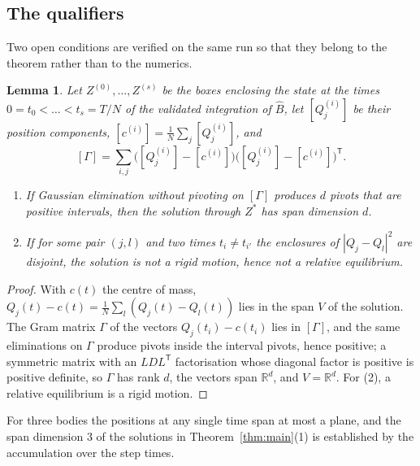 \documentclass[11pt]{amsart}
\newtheorem{lemma}[theorem]{Lemma}
\theoremstyle{definition}
\newcommand{\R}{\mathbb{R}}
\newcommand{\intv}[1]{[#1]}
\begin{document}
\subsection{The qualifiers}
Two open conditions are verified on the same run so that they belong to the theorem rather than to the numerics.

\begin{lemma}\label{lem:qualifiers}
Let $Z^{(0)},\dots,Z^{(s)}$ be the boxes enclosing the state at the times $0=t_0<\dots<t_s=T/N$ of the validated integration of $\hat B$, let $\intv{Q_j^{(i)}}$ be their position components, $\intv{c^{(i)}}=\frac1N\sum_j\intv{Q_j^{(i)}}$, and
\[
\intv{\Gamma}=\sum_{i,j}\big(\intv{Q_j^{(i)}}-\intv{c^{(i)}}\big)\big(\intv{Q_j^{(i)}}-\intv{c^{(i)}}\big)^{\mathsf T}.
\]
\begin{enumerate}
\item If Gaussian elimination without pivoting on $\intv{\Gamma}$ produces $d$ pivots that are positive intervals, then the solution through $Z^*$ has span dimension $d$.
\item If for some pair $(j,l)$ and two times $t_i\ne t_{i'}$ the enclosures of $|Q_j-Q_l|^2$ are disjoint, the solution is not a rigid motion, hence not a relative equilibrium.
\end{enumerate}
\end{lemma}

\begin{proof}
With $c(t)$ the centre of mass, $Q_j(t)-c(t)=\frac1N\sum_l(Q_j(t)-Q_l(t))$ lies in the span $V$ of the solution. The Gram matrix $\Gamma$ of the vectors $Q_j(t_i)-c(t_i)$ lies in $\intv{\Gamma}$, and the same eliminations on $\Gamma$ produce pivots inside the interval pivots, hence positive; a symmetric matrix with an $LDL^{\mathsf T}$ factorisation whose diagonal factor is positive is positive definite, so $\Gamma$ has rank $d$, the vectors span $\R^d$, and $V=\R^d$. For (2), a relative equilibrium is a rigid motion.
\end{proof}

For three bodies the positions at any single time span at most a plane, and the span dimension $3$ of the solutions in Theorem~\ref{thm:main}(1) is established by the accumulation over the step times.
\end{document}
